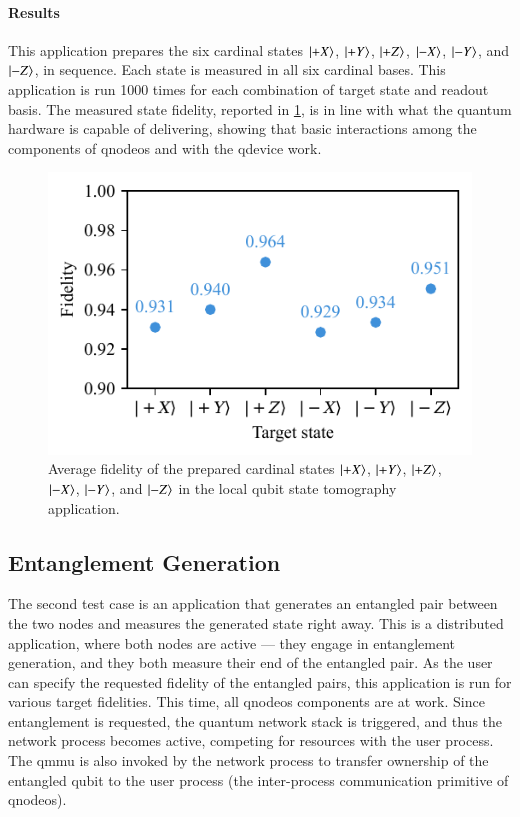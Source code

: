 \paragraph{Results}

This application prepares the six cardinal states $\ket{+X}$, $\ket{+Y}$, $\ket{+Z}$, $\ket{-X}$,
$\ket{-Y}$, and $\ket{-Z}$, in sequence. Each state is measured in all six cardinal bases. This
application is run \num{1000} times for each combination of target state and readout basis. The
measured state fidelity, reported in \cref{fig:local-tomo}, is in line with what the quantum
hardware is capable of delivering, showing that basic interactions among the components of
\acrshort{qnodeos} and with the \acrshort{qdevice} work.

\begin{figure}[t]
    \centering
    \includegraphics[width=0.6\linewidth]{figures/local-tomography.pdf}
    \caption{
        Average fidelity of the prepared cardinal states $\ket{+X}$, $\ket{+Y}$, $\ket{+Z}$,
        $\ket{-X}$, $\ket{-Y}$, and $\ket{-Z}$ in the local qubit state tomography application.
    }
    \label{fig:local-tomo}
\end{figure}

\subsection{Entanglement Generation}

The second test case is an application that generates an entangled pair between the two nodes and
measures the generated state right away. This is a distributed application, where both nodes are
active --- they engage in entanglement generation, and they both measure their end of the entangled
pair. As the user can specify the requested fidelity of the entangled pairs, this application is run
for various target fidelities. This time, all \acrshort{qnodeos} components are at work. Since
entanglement is requested, the quantum network stack is triggered, and thus the network process
becomes active, competing for resources with the user process. The \acrshort{qmmu} is also invoked
by the network process to transfer ownership of the entangled qubit to the user process (the
inter-process communication primitive of \acrshort{qnodeos}).

